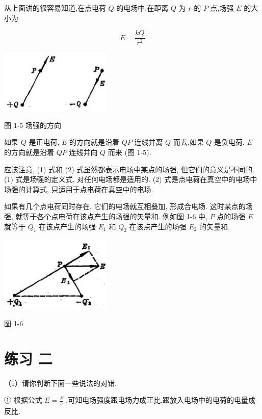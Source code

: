 \documentclass[10pt]{article}
\begin{document}
从上面讲的很容易知道,在点电荷 \(Q\) 的电场中,在距离 \(Q\) 为 \(r\) 的 \(P\) 点,场强 \(E\) 的大小为

\[
E = \frac{kQ}{{r}^{2}} \tag{2}
\]

\begin{center}
\includegraphics[max width=0.4\textwidth]{images/01913056-1f15-74d8-9184-9aab52c9d66b_20_883197.jpg}
\end{center}

图 1-5 场强的方向

如果 \(Q\) 是正电荷, \(E\) 的方向就是沿着 \({QP}\) 连线并离 \(Q\) 而去,如果 \(Q\) 是负电荷, \(E\) 的方向就是沿着 \({QP}\) 连线并向 \(Q\) 而来 (图 1-5).

应该注意, (1) 式和 (2) 式虽然都表示电场中某点的场强, 但它们的意义是不同的. (1) 式是场强的定义式, 对任何电场都是适用的. (2) 式是点电荷在真空中的电场中场强的计算式, 只适用于点电荷在真空中的电场.

如果有几个点电荷同时存在, 它们的电场就互相叠加, 形成合电场. 这时某点的场强, 就等于各个点电荷在该点产生的场强的矢量和. 例如图 1-6 中, \(P\) 点的场强 \(E\) 就等于 \({Q}_{1}\) 在该点产生的场强 \({E}_{1}\) 和 \({Q}_{2}\) 在该点产生的场强 \({E}_{2}\) 的矢量和.

\begin{center}
\includegraphics[max width=0.4\textwidth]{images/01913056-1f15-74d8-9184-9aab52c9d66b_21_278916.jpg}
\end{center}

图 1-6

\section*{练习 二}

（1）请你判断下面一些说法的对错.

① 根据公式 \(E = \frac{F}{q}\) ,可知电场强度跟电场力成正比,跟放入电场中的电荷的电量成反比.
\end{document}

